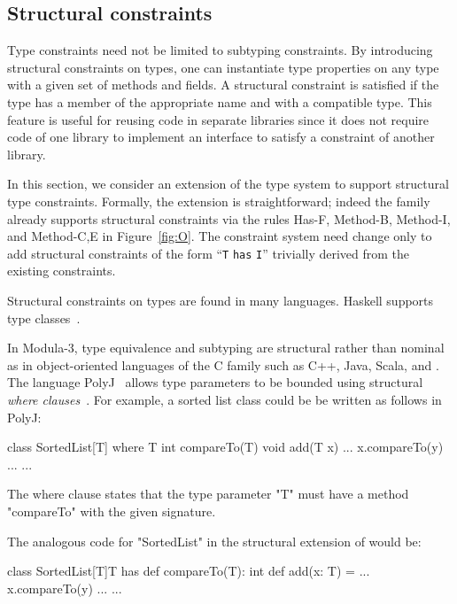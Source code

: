 \subsection{Structural constraints}
\label{sec:structural}
\label{sec:structural-typing}

Type constraints need not be limited to subtyping constraints.
By introducing structural constraints on types, one can
instantiate
type properties on any type with a given set
of methods and fields.
A structural constraint is satisfied if the type has a member of
the appropriate name and with a compatible type.
This feature is useful for reusing code
in separate libraries since it does not require
code of one library to implement an interface to satisfy a
constraint of another library.

In this section, we consider an extension of the \Xten{} type system
to support structural type constraints.  Formally, the extension
is straightforward; indeed the \FX{} family already supports structural constraints
via the rules {\sc Has-F},
{\sc Method-B},
{\sc Method-I},
and
{\sc Method-C,E} in Figure~\ref{fig:O}.
The constraint system need change only to add 
structural
constraints of the form ``{\tt T} {\tt has} {\tt I}''
trivially derived from the existing constraints.

Structural constraints on types are found in many languages.
Haskell supports type
classes~\cite{haskell,haskell-type-classes}.

In Modula-3, type equivalence and subtyping are structural
rather than nominal as in object-oriented languages of the C
family such as C++, Java, Scala, and \Xten{}.
%
The language PolyJ~\cite{java-popl97} allows type parameters to be
bounded using
structural \emph{where clauses}~\cite{where-clauses}.
For example, a sorted list class %
could be
be written as follows in PolyJ:
{\footnotesize
\begin{xten}
class SortedList[T] where T {int compareTo(T)} {
    void add(T x) { ... x.compareTo(y) ... }
    ...
}
\end{xten}}
The where clause states that the type parameter \xcd"T" must have a
method \xcd"compareTo" with the given signature.

The analogous code for \xcd"SortedList" in the structural
extension of \Xten{} would be:
{\footnotesize
\begin{xten}
class SortedList[T]{T has def compareTo(T): int} {
    def add(x: T) = { ... x.compareTo(y) ... }
    ...
}
\end{xten}}

